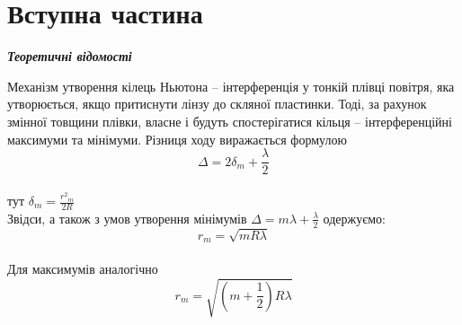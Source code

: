 \section{Вступна частина}
\setlength{\parindent}{4em}
\begin{center}
\textbf{\emph{Теоретичні відомості}}
\end{center}
\qquad Механізм утворення кілець Ньютона – інтерференція у тонкій плівці повітря, яка утворюється, якщо притиснути лінзу до скляної пластинки. Тоді, за рахунок змінної товщини плівки, власне і будуть спостерігатися кільця – інтерференційні максимуми та мінімуми. Різниця ходу виражається формулою $$\Delta = 2 \delta_{m} + \frac{\lambda}{2}$$\\ тут $\delta_{m} = \frac{{r^2}_{m}}{2R}$ \\
Звідси, а також з умов утворення мінімумів $\Delta = m \lambda + \frac{\lambda}{2}$ одержуємо:
$$r_{m} = \sqrt{mR \lambda}$$ \\
Для максимумів аналогічно
$$r_{m} = \sqrt{(m+\frac{1}{2})R \lambda}$$
